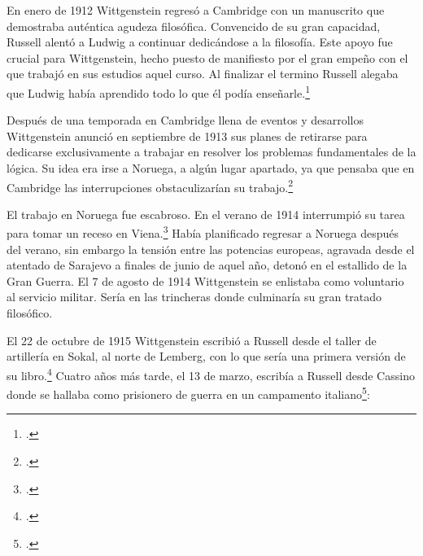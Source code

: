 En enero de 1912 Wittgenstein regresó a Cambridge con un manuscrito que
demostraba auténtica agudeza filosófica. Convencido de su gran capacidad,
Russell alentó a Ludwig a continuar dedicándose a la filosofía. Este apoyo fue
crucial para Wittgenstein, hecho puesto de manifiesto por el gran empeño con el
que trabajó en sus estudios aquel curso. Al finalizar el termino Russell alegaba
que Ludwig había aprendido todo lo que él podía enseñarle.\footcite[cap. 3 loc
865]{monk}

Después de una temporada en Cambridge llena de eventos y desarrollos
Wittgenstein anunció en septiembre de 1913 sus planes de retirarse para
dedicarse exclusivamente a trabajar en resolver los problemas fundamentales de
la lógica. Su idea era irse a Noruega, a algún lugar apartado, ya que pensaba
que en Cambridge las interrupciones obstaculizarían su trabajo.\footcite[cap. 4
loc 1844]{monk}

 El trabajo en Noruega fue escabroso.
En el verano de 1914 interrumpió su tarea para tomar un receso en
Viena.\footcite[cap. 5 loc 2154]{monk} Había planificado regresar a Noruega
después del verano, sin embargo la tensión entre las potencias europeas,
agravada desde el atentado de Sarajevo a finales de junio de aquel año, detonó
en el estallido de la Gran Guerra. El 7 de agosto de 1914 Wittgenstein se
enlistaba como voluntario al servicio militar. Sería en las trincheras donde
culminaría su gran tratado filosófico.

El 22 de octubre de 1915 Wittgenstein escribió a Russell desde el taller de
artillería en Sokal, al norte de Lemberg, con lo que sería una primera versión
de su libro.\footcite[cf. p.84]{cambridgeletters} Cuatro años más tarde, el 13
de marzo, escribía a Russell desde Cassino donde se hallaba como prisionero de
guerra en un campamento italiano\footcite[cf. p.268]{mcguinness}: 

